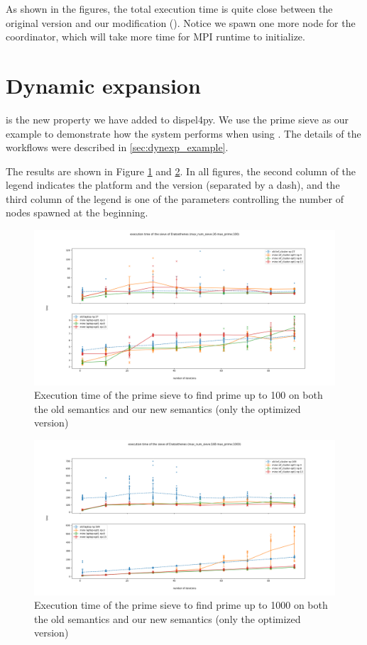 As shown in the figures, the total execution time is quite close between the original \dpy version and our modification (\tincdep). Notice we spawn one more node for the coordinator, which will take more time for MPI runtime to initialize.

\section{Dynamic expansion}
\tDynexp is the new property we have added to dispel4py. We use the prime sieve as our example to demonstrate how the system performs when using \tdynexp. The details of the workflows were described in \ref{sec:dynexp_example}.

The results are shown in Figure \ref{fig:sieve_opt_100} and \ref{fig:sieve_opt_1000}. In all figures, the second column of the legend indicates the platform and the version (separated by a dash), and the third column of the legend is one of the parameters controlling the number of nodes spawned at the beginning.

\begin{figure}[h]
\centering
    \includegraphics[width=1\textwidth]{figures/sieve_opt1_100}
\caption{Execution time of the prime sieve to find prime up to 100 on both the old semantics and our new semantics (only the optimized version)}
\label{fig:sieve_opt_100}
\end{figure}

\begin{figure}[h]
\centering
    \includegraphics[width=1\textwidth]{figures/sieve_opt1_1000}
\caption{Execution time of the prime sieve to find prime up to 1000 on both the old semantics and our new semantics (only the optimized version)}
\label{fig:sieve_opt_1000}
\end{figure}

